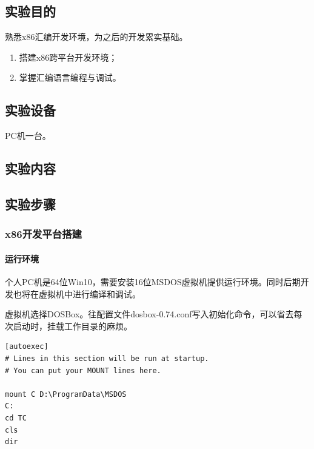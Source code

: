 \documentclass{ctexart}
\begin{document}
	\subsection{实验目的}%
	\label{sub:实验目的\chinese{section}}

	熟悉x86汇编开发环境，为之后的开发累实基础。

	\begin{enumerate}
		\item 搭建x86跨平台开发环境；
		\item 掌握汇编语言编程与调试。
	\end{enumerate}

	\subsection{实验设备}%
	\label{sub:实验设备\chinese{section}}

	PC机一台。

	\subsection{实验内容}%
	\label{sub:实验内容\chinese{section}}

	\subsection{实验步骤}%
	\label{sub:实验步骤\chinese{section}}

	\subsubsection{x86开发平台搭建}%
	\label{ssub:x86开发平台搭建}

	\paragraph{运行环境}%
	\label{par:运行环境}

	个人PC机是64位Win10，需要安装16位MSDOS虚拟机提供运行环境。同时后期开发也将在虚拟机中进行编译和调试。


	虚拟机选择DOSBox。往配置文件dosbox-0.74.conf写入初始化命令，可以省去每次启动时，挂载工作目录的麻烦。

	\begin{verbatim}
[autoexec]
# Lines in this section will be run at startup.
# You can put your MOUNT lines here.

mount C D:\ProgramData\MSDOS
C:
cd TC
cls
dir

	\end{verbatim}
\end{document}
